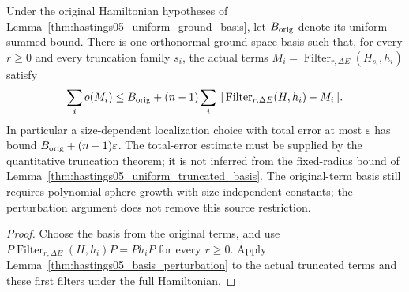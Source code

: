 \begin{lemma}
    \label{thm:hastings05_basis_coupled_radius}
    \leanok
    Under the original Hamiltonian hypotheses of
    Lemma~\ref{thm:hastings05_uniform_ground_basis}, let $B_{\rm orig}$ denote
    its uniform summed bound. There is one orthonormal ground-space basis such
    that, for every $r\ge0$ and every truncation family $s_i$, the actual terms
    $M_i=\operatorname{Filter}_{r,\Delta E}(H_{s_i},h_i)$ satisfy
    \begin{align*}
        \sum_i o(M_i)\le B_{\rm orig}+(n-1)\sum_i
        \|\operatorname{Filter}_{r,\Delta E}(H,h_i)-M_i\|.
    \end{align*}
    In particular a size-dependent localization choice with total error at most
    $\varepsilon$ has bound $B_{\rm orig}+(n-1)\varepsilon$. The total-error
    estimate must be supplied by the quantitative truncation theorem; it is
    not inferred from the fixed-radius bound of
    Lemma~\ref{thm:hastings05_uniform_truncated_basis}. The original-term
    basis still requires polynomial sphere growth with size-independent
    constants; the perturbation argument does not remove this source
    restriction\cite{gap:hastings05_geometric_growth_scope}.
\end{lemma}
\begin{proof}\leanok
    Choose the basis from the original terms, and use
    $P\operatorname{Filter}_{r,\Delta E}(H,h_i)P=Ph_iP$ for every $r\ge0$.
    Apply Lemma~\ref{thm:hastings05_basis_perturbation} to the actual truncated
    terms and these first filters under the full Hamiltonian.
\end{proof}
